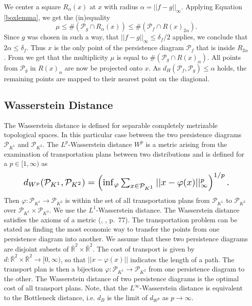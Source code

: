 \documentclass{article}
\begin{document}
We center a square $R_\alpha(x)$ at $x$ with radius $\alpha = ||f-g||_\infty$. Applying Equation \ref{boxlemma}, we get the (in)equality
\begin{equation}
\mu \leq \#(\mathcal{P}_g \cap R_\alpha(x)) \leq \#(\mathcal{P}_f \cap R(x)_{2\alpha}).
\end{equation}
Since $g$ was chosen in such a way, that $||f-g||_\infty \leq \delta_f / 2$ applies, we conclude that $2 \alpha \leq \delta_f$. Thus $x$ is the only point of the persistence diagram $\mathcal{P}_f$ that is inside $R_{2\alpha}$. From we get that the multiplicity $\mu$ is equal to $\#(\mathcal{P}_g \cap R(x)_\alpha)$. All points from $\mathcal{P}_g$ in $R(x)_\alpha$ are now be projected onto $x$. As $d_H(\mathcal{P}_f, \mathcal{P}_g) \leq \alpha$ holds, the remaining points are mapped to their nearest point on the diagional.

\subsection{Wasserstein Distance}
The Wasserstein distance is defined for separable completely metrizable topological spaces. In this particular case between the two persistence diagrams $\mathcal{P}_{K^1}$ and $\mathcal{P}_{K^2}$. The $L^p$-Wasserstein distance $W^p$ is a metric arising from the examination of transportation plans between two distributions and is defined for a $p \in [1,\infty)$ as
\begin{equation}
\resizebox{0.88\columnwidth}{!}
{$d_{W^p}(\mathcal{P}_{K^1},\mathcal{P}_{K^2}) = \left(\inf_{\varphi} \sum_{x \in \mathcal{P}_{K^1}} ||x-\varphi(x)||^p_\infty\right)^{1/p}.$}
\end{equation}
Then $\varphi: \mathcal{P}_{K^1}\rightarrow \mathcal{P}_{K^2}$ is within the set of all transportation plans from $\mathcal{P}_{K^1}$ to $\mathcal{P}_{K^2}$ over $\mathcal{P}_{K^1} \times \mathcal{P}_{K^2}$. We use the $L^1$-Wasserstein distance. The Wasserstein distance satisfies the axioms of a metric (\citeauthor{villani2008optimal}, \citeyear{villani2008optimal}, p.~77). The transportation problem can be stated as finding the most economic way to transfer the points from one persistence diagram into another. We assume that these two persistence diagrams are disjoint subsets of $\bar{\mathbb{R}}^2 \times \bar{\mathbb{R}}^2$. The cost of transport is given by $d: \bar{\mathbb{R}}^2 \times \bar{\mathbb{R}}^2 \rightarrow [0,\infty)$, so that $||x-\varphi(x)||$ indicates the length of a path. The transport plan is then a bijection $\varphi: \mathcal{P}_{K^1} \rightarrow \mathcal{P}_{K^2}$ from one persistence diagram to the other. The Wasserstein distance of two persistence diagrams is the optimal cost of all transport plans. Note, that the $L^\infty$-Wasserstein distance is equivalent to the Bottleneck distance, i.e. $d_{B}$ is the limit of $d_{W^p}$ as $p \rightarrow \infty$.
\end{document}
